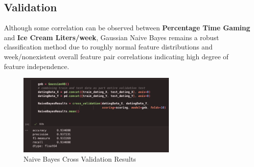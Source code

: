\documentclass{article}
\begin{document}
    \subsection*{Validation}

    Although some correlation can be observed between \textbf{Percentage Time Gaming} and
    \textbf{Ice Cream Liters/week}, Gaussian Naive Bayes remains a robust classification method due to
    roughly normal feature distributions and week/nonexistent overall feature pair correlations indicating
    high degree of feature independence.

    \begin{figure}[H]
        \centering
        \includegraphics[width=0.7\textwidth, height=0.25\textheight]{NB_results.png}
        \caption{\small{Naive Bayes Cross Validation Results}}
    \end{figure}
\end{document}
